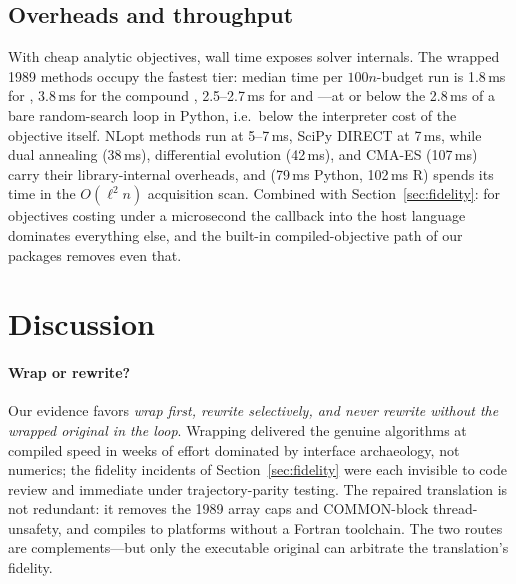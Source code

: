 \subsection{Overheads and throughput}

With cheap analytic objectives, wall time exposes solver internals.
The wrapped 1989 methods occupy the fastest tier: median time per
$100n$-budget run is 1.8\,ms for , 3.8\,ms for the
compound , 2.5--2.7\,ms for  and
---at or below the 2.8\,ms of a bare random-search loop
in Python, i.e.\ below the interpreter cost of the objective itself.
NLopt methods run at 5--7\,ms, SciPy DIRECT at 7\,ms, while dual
annealing (38\,ms), differential evolution (42\,ms), and CMA-ES
(107\,ms) carry their library-internal overheads, and 
(79\,ms Python, 102\,ms R) spends its time in the $O(\ell^2 n)$
acquisition scan.
Combined with Section~\ref{sec:fidelity}: for objectives costing under
a microsecond the callback into the host language dominates everything
else, and the built-in compiled-objective path of our packages removes
even that.

\section{Discussion}
\label{sec:discussion}

\paragraph{Wrap or rewrite?} Our evidence favors \emph{wrap first,
rewrite selectively, and never rewrite without the wrapped original in
the loop}. Wrapping delivered the genuine algorithms at compiled speed
in weeks of effort dominated by interface archaeology, not numerics;
the fidelity incidents of Section~\ref{sec:fidelity} were each invisible
to code review and immediate under trajectory-parity testing. The
repaired translation is not redundant: it removes the 1989 array caps
and COMMON-block thread-unsafety, and compiles to platforms without a
Fortran toolchain. The two routes are complements---but only the
executable original can arbitrate the translation's fidelity.

